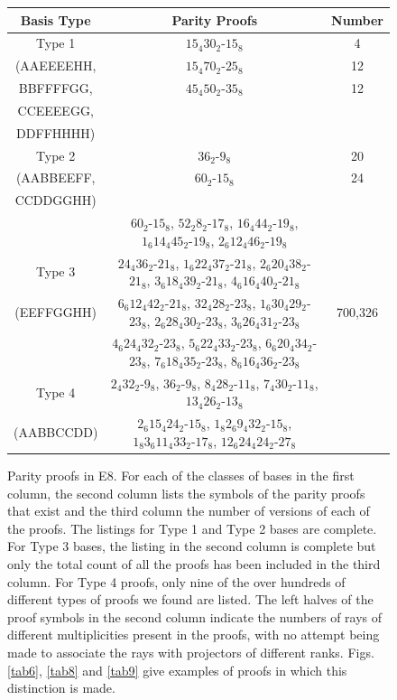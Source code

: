 \begin{figure}[ht]
\centering %
\begin{tabular}{|c | c |c |} %
\hline %
Basis Type & Parity Proofs  &   Number  \\
\hline
Type 1 & $15_{4}30_{2}$-$15_{8}$ & 4\\
(AAEEEEHH, & $15_{4}70_{2}$-$25_{8}$ & 12\\
BBFFFFGG, & $45_{4}50_{2}$-$35_{8}$ & 12\\
CCEEEEGG, & & \\
DDFFHHHH) & & \\
\hline
Type 2 & $36_{2}$-$9_{8}$ & 20\\
(AABBEEFF, & $60_{2}$-$15_{8}$ & 24\\
CCDDGGHH) & & \\
\hline
 & $60_{2}$-$15_{8}$, $52_{2}8_{2}$-$17_{8}$, $16_{4}44_{2}$-$19_{8}$, $1_{6}14_{4}45_{2}$-$19_{8}$,
$2_{6}12_{4}46_{2}$-$19_{8}$ & \\
Type 3 & $24_{4}36_{2}$-$21_{8}$, $1_{6}22_{4}37_{2}$-$21_{8}$, $2_{6}20_{4}38_{2}$-$21_{8}$, $3_{6}18_{4}39_{2}$-$21_{8}$, $4_{6}16_{4}40_{2}$-$21_{8}$ & \\
(EEFFGGHH)  & $6_{6}12_{4}42_{2}$-$21_{8}$, $32_{4}28_{2}$-$23_{8}$, $1_{6}30_{4}29_{2}$-$23_{8}$, $2_{6}28_{4}30_{2}$-$23_{8}$, $3_{6}26_{4}31_{2}$-$23_{8}$ & 700,326 \\
  & $4_{6}24_{4}32_{2}$-$23_{8}$, $5_{6}22_{4}33_{2}$-$23_{8}$, $6_{6}20_{4}34_{2}$-$23_{8}$, $7_{6}18_{4}35_{2}$-$23_{8}$, $8_{6}16_{4}36_{2}$-$23_{8}$ & \\
\hline
Type 4 &$2_{4}32_{2}$-$9_{8}$, $36_{2}$-$9_{8}$, $8_{4}28_{2}$-$11_{8}$, $7_{4}30_{2}$-$11_{8}$, $13_{4}26_{2}$-$13_{8}$ &   \\
(AABBCCDD) &$2_{6}15_{4}24_{2}$-$15_{8}$, $1_{8}2_{6}9_{4}32_{2}$-$15_{8}$, $1_{8}3_{6}11_{4}33_{2}$-$17_{8}$, $12_{6}24_{4}24_{2}$-$27_{8}$  & \\
\hline
\end{tabular}
\caption{Parity proofs in E8. For each of the classes of bases in the first column, the second column lists the symbols of the parity proofs that exist and the third column the number of versions of each of the proofs. The listings for Type 1 and Type 2 bases are complete. For Type 3 bases, the listing in the second column is complete but only the total count of all the proofs has been included in the third column. For Type 4 proofs, only nine of the over hundreds of different types of proofs we found are listed. The left halves of the proof symbols in the second column indicate the numbers of rays of different multiplicities present in the proofs, with no attempt being made to associate the rays with projectors of different ranks. Figs. \ref{tab6}, \ref{tab8} and \ref{tab9} give examples of proofs in which this distinction is made.}
\label{tab5}
\end{figure}

